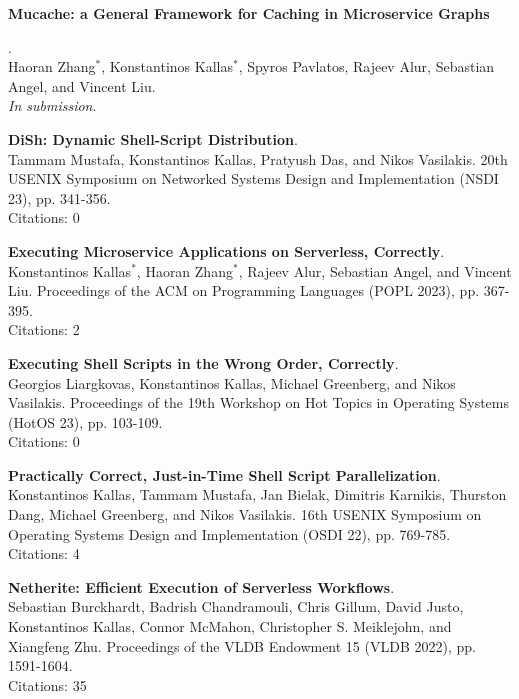 \begin{minipage}{\textwidth}
\hypertarget{sec:publications}{\textbf{Mucache: a General Framework for Caching in Microservice Graphs}}. \\
Haoran Zhang$^*$, Konstantinos Kallas$^*$, Spyros Pavlatos, Rajeev Alur, Sebastian Angel, and Vincent Liu. \\
\emph{In submission}.
\end{minipage}

\begin{minipage}{\textwidth}
\textbf{DiSh: Dynamic Shell-Script Distribution}. \\
Tammam Mustafa, Konstantinos Kallas, Pratyush Das, and Nikos Vasilakis.
20th USENIX Symposium on Networked Systems Design and Implementation (NSDI 23), pp. 341-356. \\
Citations: 0
\end{minipage}

\begin{minipage}{\textwidth}
\textbf{Executing Microservice Applications on Serverless, Correctly}. \\
Konstantinos Kallas$^*$, Haoran Zhang$^*$, Rajeev Alur, Sebastian Angel, and Vincent Liu.
Proceedings of the ACM on Programming Languages (POPL 2023), pp. 367-395. \\
Citations: 2
\end{minipage}

\begin{minipage}{\textwidth}
\textbf{Executing Shell Scripts in the Wrong Order, Correctly}. \\
Georgios Liargkovas, Konstantinos Kallas, Michael Greenberg, and Nikos Vasilakis.
Proceedings of the 19th Workshop on Hot Topics in Operating Systems (HotOS 23), pp. 103-109. \\
Citations: 0
\end{minipage}

\begin{minipage}{\textwidth}
\textbf{Practically Correct, Just-in-Time Shell Script Parallelization}. \\
Konstantinos Kallas, Tammam Mustafa, Jan Bielak, Dimitris Karnikis, Thurston Dang, Michael Greenberg, and Nikos Vasilakis.
16th USENIX Symposium on Operating Systems Design and Implementation (OSDI 22), pp. 769-785. \\
Citations: 4
\end{minipage}

\begin{minipage}{\textwidth}
\textbf{Netherite: Efficient Execution of Serverless Workflows}. \\
Sebastian Burckhardt, Badrish Chandramouli, Chris Gillum, David Justo, Konstantinos Kallas, Connor McMahon, Christopher S. Meiklejohn, and Xiangfeng Zhu.
Proceedings of the VLDB Endowment 15 (VLDB 2022), pp. 1591-1604. \\
Citations: 35
\end{minipage}

